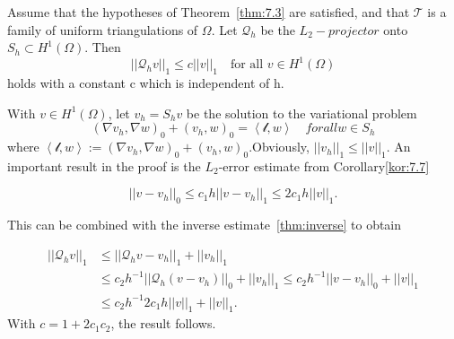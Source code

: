 \begin{corollary}
    Assume that the hypotheses of Theorem~\ref{thm:7.3} are satisfied, and that $\mathcal{T}$ is a family of uniform triangulations of $\Omega$. Let $\mathcal{Q}_h$ be the $L_2-projector$ onto $S_h \subset H^1(\Omega)$. Then
    \begin{equation}
        ||\mathcal{Q}_h v||_1 \leq c||v||_1\quad \text{for all } v\in H^1(\Omega)
    \end{equation}
    holds with a constant c which is independent of h.
\end{corollary}

\begin{bev}
    With $v \in H^1(\Omega)$, let $v_h = S_h v$ be the solution to the variational problem
    \begin{equation}
        {\left( \nabla v_h, \nabla w \right)}_0 + {\left( v_h, w \right)}_0 = \left< \mathcal{l}, w \right> \quad for all w \in S_h
    \end{equation}
    where $\left< \mathcal{l}, w \right> := {\left( \nabla v_h, \nabla w \right)}_0 + {\left( v_h, w \right)}_0$.Obviously, $||v_h||_1 \leq ||v||_1$. An important result in the proof is the $L_2$-error estimate from Corollary\ref{kor:7.7}

    \begin{equation}
        ||v - v_h||_0 \leq c_1h||v-v_h||_1 \leq 2c_1h||v||_1.
    \end{equation}

    This can be combined with the inverse estimate~\ref{thm:inverse} to obtain

    \begin{align}
        || \mathcal{Q}_h v ||_1 &\leq || \mathcal{Q}_h v - v_h||_1 + ||v_h||_1 \\
                                &\leq c_2 h^{-1} ||\mathcal{Q}_h \left( v - v_h \right)||_0 + ||v_h||_1 \leq c_2h^{-1}||v-v_h||_0 + ||v||_1 \\
                                &\leq c_2h^{-1}2c_1h||v||_1 + ||v||_1.
    \end{align}
    With $c = 1+ 2c_1c_2$, the result follows.
\end{bev}